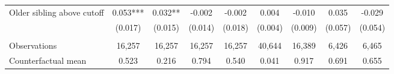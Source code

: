 {{\begin{tabular}{lcccccccc}
Older sibling above cutoff&       0.053***&       0.032** &      -0.002   &      -0.002   &       0.004   &      -0.010   &       0.035   &      -0.029   \\
                    &     (0.017)   &     (0.015)   &     (0.014)   &     (0.018)   &     (0.004)   &     (0.009)   &     (0.057)   &     (0.054)   \\
                    &               &               &               &               &               &               &               &               \\
Observations        &      16,257   &      16,257   &      16,257   &      16,257   &      40,644   &      16,389   &       6,426   &       6,465   \\
Counterfactual mean &       0.523   &       0.216   &       0.794   &       0.540   &       0.041   &       0.917   &       0.691   &       0.655   \\
 

\bottomrule
\end{tabular}
}
}
